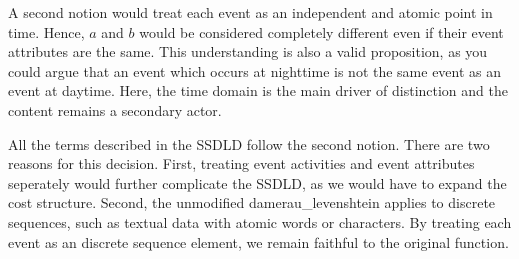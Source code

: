 \documentclass[./../../paper.tex]{subfiles}
\begin{document}
A second notion would treat each event as an independent and atomic point in time. Hence, $a$ and $b$ would be considered completely different even if their event attributes are the same. This understanding is also a valid proposition, as you could argue that an event which occurs at nighttime is not the same event as an event at daytime. Here, the time domain is the main driver of distinction and the content remains a secondary actor. 

All the terms described in the \gls{SSDLD} follow the second notion. There are two reasons for this decision. First, treating event activities and event attributes seperately would further complicate the \gls{SSDLD}, as we would have to expand the cost structure. Second, the unmodified \gls{damerau_levenshtein} applies to discrete sequences, such as textual data with atomic words or characters. By treating each event as an discrete sequence element, we remain faithful to the original function.
\end{document}
